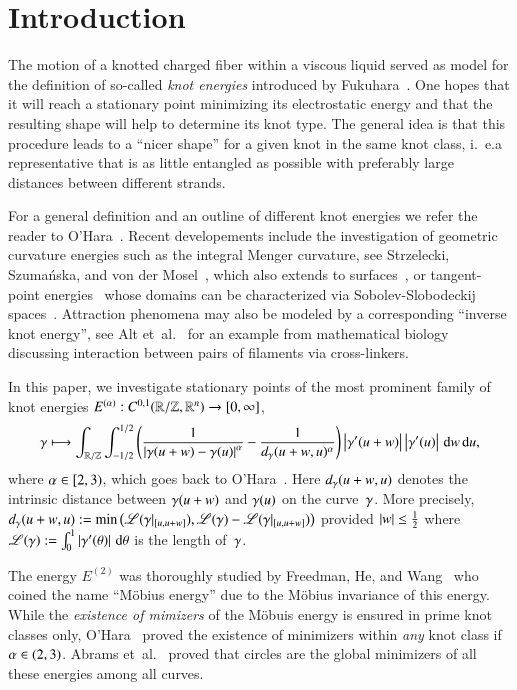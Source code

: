\section{Introduction}

The motion of a knotted charged fiber within a viscous liquid
served as model for the definition of so-called \emph{knot energies}
introduced by Fukuhara~\cite{fete}.
One hopes that it will reach a stationary point minimizing its electrostatic energy
and that the resulting shape will help to determine its knot type.
The general idea is that this procedure leads to
a ``nicer shape'' for a given knot in the same knot class, i.~e.\@ a
representative that is as little entangled as possible with preferably large distances between
different strands.

For a general definition and
an outline of different knot energies we refer the reader to O'Hara~\cite{oha:en-kn}.
Recent developements include the investigation of geometric curvature energies such as the integral Menger curvature,
see Strzelecki, Szuma{\'n}ska, and von der Mosel~\cite{SM4,SM5},
which also extends to surfaces~\cite{SM6},
or tangent-point energies~\cite{SM7}
whose domains can be characterized via Sobolev-Slobodeckij spaces~\cite{blatt:tpe}.
Attraction phenomena may also be modeled by a corresponding ``inverse
knot energy'', see Alt et~al.~\cite{alt-felix}
for an example from mathematical biology discussing interaction between pairs of
filaments via cross-linkers.

In this paper, we investigate stationary points of the most prominent family of knot energies $E^{(\alpha)}:C^{0,1}(\mathbb{R}/\mathbb{Z},\mathbb{R}^n)\to[0,\infty]$,
\begin{equation*}
  \gamma \longmapsto
  \int_{\mathbb{R}/\mathbb{Z}}\int_{-1/2}^{1/2}
  \left(\frac{1}{\left|\gamma(u+w)-\gamma(u)\right|^{\alpha}} - \frac{1}{d_\gamma(u+w,u)^{\alpha}}\right)
  \left|{\gamma}'(u+w)\right|\left|{\gamma}'(u)\right| \,\mathrm{d} w\,\mathrm{d} u, \label{eq:a}
\end{equation*}
where $\alpha\in[2,3)$, which goes back to O'Hara~\cite{oha:en,oha:fam-en,oha:en-func}.
Here $d_\gamma(u+w,u)$ denotes the intrinsic distance between $\gamma(u+w)$ and $\gamma(u)$ on the curve~$\gamma$.
More precisely,
$d_\gamma(u+w,u):= \min\big(\mathscr L(\gamma|_{[u,u+w]}),\mathscr L(\gamma)-\mathscr L(\gamma|_{[u,u+w]})\big)$
provided $\left|w\right|\le\tfrac12$ where
$\mathscr L(\gamma) := \int_0^1 \left|{\gamma}'(\theta)\right|\,\mathrm{d}\theta$
is the length of~$\gamma$.

The energy $E^{(2)}$ was thoroughly studied by Freedman, He, and Wang~\cite{fhw}
who coined the name ``M\"obius energy'' due to the M\"obius invariance of this energy.
While the \emph{existence of mimizers} of the M\"obuis energy is ensured in prime knot classes only,
O'Hara~\cite{oha:fam-en,oha:en-func} proved the existence of minimizers within
\emph{any} knot class if $\alpha\in(2,3)$.
Abrams et~al.~\cite{acfgh} proved that circles are the global minimizers of all these energies 
among all curves.

